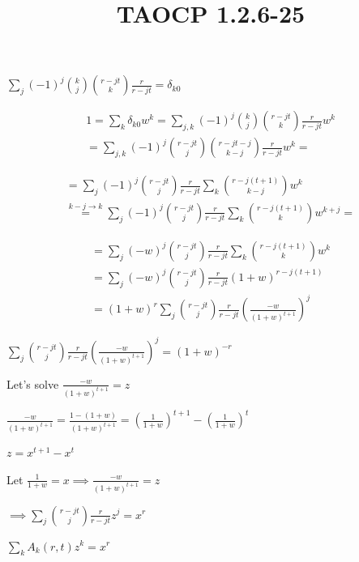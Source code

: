 \documentclass{article}
\title{TAOCP 1.2.6\mbox{-}25}
\begin{document}
\maketitle

\( \sum_{j} {(-1)}^{j} \binom{k}{j} \binom{r-jt}{k}\frac{r}{r-jt} = \delta_{k0} \)

\begin{multline*}
1 = \sum_{k} \delta_{k0} w^{k} = \sum_{j,k} {(-1)}^{j} \binom{k}{j}\binom{r-jt}{k}\frac{r}{r-jt} w^{k} \\
= \sum_{j,k} {(-1)}^{j} \binom{r-jt}{j}\binom{r-jt-j}{k-j} \frac{r}{r-jt} w^{k} =
\end{multline*}

\begin{multline*}
= \sum_{j} {(-1)}^{j} \binom{r-jt}{j} \frac{r}{r-jt} \sum_{k} \binom{r-j(t+1)}{k-j} w^{k} \\
\overset{k-j \to k}{=} \sum_{j} {(-1)}^{j} \binom{r-jt}{j} \frac{r}{r-jt} \sum_{k} \binom{r-j(t+1)}{k} w^{k+j} =
\end{multline*}

\begin{multline*}
= \sum_{j} {(-w)}^{j} \binom{r-jt}{j} \frac{r}{r-jt} \sum_{k} \binom{r-j(t+1)}{k} w^{k} \\
= \sum_{j} {(-w)}^{j} \binom{r-jt}{j} \frac{r}{r-jt} {(1+w)}^{r-j(t+1)} \\
= {(1+w)}^{r} \sum_{j} \binom{r-jt}{j} \frac{r}{r-jt} {(\frac{-w}{{(1+w)}^{t+1}})}^{j}
\end{multline*}

\( \sum_{j} \binom{r-jt}{j} \frac{r}{r-jt} {(\frac{-w}{{(1+w)}^{t+1}})}^{j} = {(1+w)}^{-r} \)

Let's solve \( \frac{-w}{{(1+w)}^{t+1}} = z \)

\( \frac{-w}{{(1+w)}^{t+1}} = \frac{1-(1+w)}{{(1+w)}^{t+1}} = {(\frac{1}{1+w})}^{t+1} - {(\frac{1}{1+w})}^{t} \)

\( z = x^{t+1} - x^{t} \)

Let \( \frac{1}{1+w} = x \implies \frac{-w}{{(1+w)}^{t+1}} = z \)

\( \implies \sum_{j} \binom{r-jt}{j} \frac{r}{r-jt} z^{j} = x^{r} \)

\( \sum_{k} A_{k}(r,t)z^{k} = x^{r} \)
\end{document}
